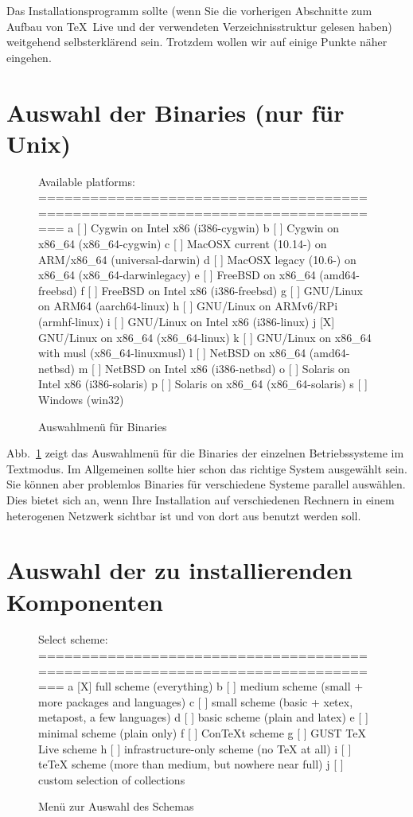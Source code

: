 \documentclass[12pt,ngerman,a4paper,fullparskip]{scrreprt}
\newcommand{\TL}{\TeX\ Live\xspace}
\begin{document}
Das Installationsprogramm sollte (wenn Sie die vorherigen Abschnitte zum Aufbau von \TL und der verwendeten Verzeichnisstruktur gelesen haben) weitgehend selbsterklärend sein. Trotzdem wollen wir auf einige Punkte näher eingehen.

\section{Auswahl der Binaries (nur für Unix)}\label{sec:binary}


\begin{figure}[tb]
\begin{boxedverbatim}
Available platforms:
===============================================================================
   a [ ] Cygwin on Intel x86 (i386-cygwin)
   b [ ] Cygwin on x86_64 (x86_64-cygwin)
   c [ ] MacOSX current (10.14-) on ARM/x86_64 (universal-darwin)
   d [ ] MacOSX legacy (10.6-) on x86_64 (x86_64-darwinlegacy)
   e [ ] FreeBSD on x86_64 (amd64-freebsd)
   f [ ] FreeBSD on Intel x86 (i386-freebsd)
   g [ ] GNU/Linux on ARM64 (aarch64-linux)
   h [ ] GNU/Linux on ARMv6/RPi (armhf-linux)
   i [ ] GNU/Linux on Intel x86 (i386-linux)
   j [X] GNU/Linux on x86_64 (x86_64-linux)
   k [ ] GNU/Linux on x86_64 with musl (x86_64-linuxmusl)
   l [ ] NetBSD on x86_64 (amd64-netbsd)
   m [ ] NetBSD on Intel x86 (i386-netbsd)
   o [ ] Solaris on Intel x86 (i386-solaris)
   p [ ] Solaris on x86_64 (x86_64-solaris)
   s [ ] Windows (win32)
\end{boxedverbatim}
\caption{Auswahlmenü für Binaries}\label{fig:bin-text}
\end{figure}

\noindent Abb.~\ref{fig:bin-text} zeigt das Auswahlmenü für die Binaries der einzelnen Betriebssysteme im Textmodus. Im Allgemeinen sollte hier schon das richtige System ausgewählt sein. Sie können aber problemlos Binaries
für verschiedene Systeme parallel auswählen. Dies bietet sich an, wenn Ihre Installation auf verschiedenen Rechnern in einem heterogenen Netzwerk sichtbar ist und von dort aus benutzt werden soll.

\section{Auswahl der zu installierenden Komponenten}\label{sec:components}

\begin{figure}[tbh]
\begin{boxedverbatim}
Select scheme:
===============================================================================
 a [X] full scheme (everything)
 b [ ] medium scheme (small + more packages and languages)
 c [ ] small scheme (basic + xetex, metapost, a few languages)
 d [ ] basic scheme (plain and latex)
 e [ ] minimal scheme (plain only)
 f [ ] ConTeXt scheme
 g [ ] GUST TeX Live scheme
 h [ ] infrastructure-only scheme (no TeX at all)
 i [ ] teTeX scheme (more than medium, but nowhere near full)
 j [ ] custom selection of collections
\end{boxedverbatim}
\caption{Menü zur Auswahl des Schemas}\label{fig:scheme-text}
\end{figure}
\end{document}
